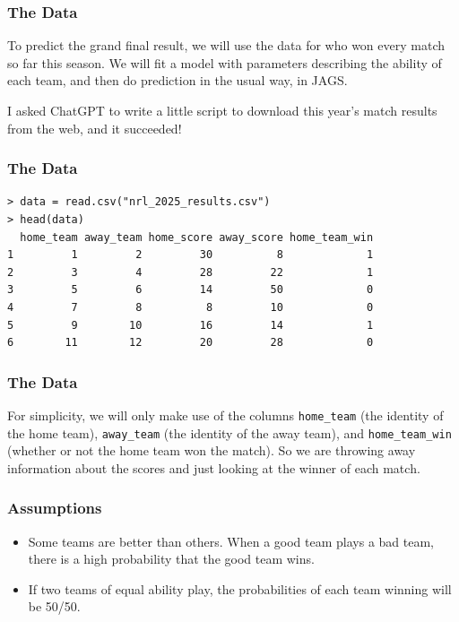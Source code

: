\documentclass{beamer}
\begin{document}
\begin{frame}
\frametitle{The Data}
To predict the grand final result, we will use the data for who won every match
so far this season. We will fit a model with parameters describing the ability
of each team, and then do prediction in the usual way, in JAGS.\\[0.5em]\pause

I asked ChatGPT to write a little script to download this year's match results
from the web, and it succeeded!
\end{frame}


\begin{frame}[fragile]
\frametitle{The Data}

\begin{verbatim}
> data = read.csv("nrl_2025_results.csv")
> head(data)
  home_team away_team home_score away_score home_team_win
1         1         2         30          8             1
2         3         4         28         22             1
3         5         6         14         50             0
4         7         8          8         10             0
5         9        10         16         14             1
6        11        12         20         28             0
\end{verbatim}

\end{frame}


\begin{frame}[fragile]
\frametitle{The Data}
For simplicity, we will only make use of the columns
\texttt{home_team} (the identity of the home team),
\texttt{away_team} (the identity of the away team),
and \texttt{home_team_win} (whether or not the home team won the match).
So we are throwing away information about
the scores and just looking at the winner of each match.

\end{frame}


\begin{frame}[fragile]
\frametitle{Assumptions}
\begin{itemize}
\item Some teams are better than others. When a good team plays a bad team, there is a high probability that the good team wins.\pause
\item If two teams of equal ability play, the probabilities of each team winning
will be 50/50.
\end{itemize}
\end{frame}
\end{document}
